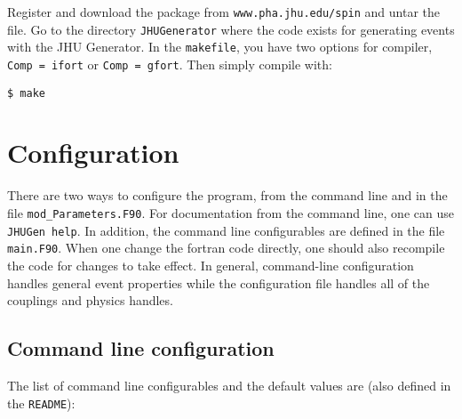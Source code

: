 \documentclass[aps,superscriptaddress,nofootinbib]{revtex4}
\begin{document}
\noindent
Register and download the package from \verb|www.pha.jhu.edu/spin| and untar the file.  Go to the directory \verb|JHUGenerator| where the code exists for generating events with the JHU Generator. In the \verb|makefile|, you have two options for compiler, \verb|Comp = ifort| or \verb|Comp = gfort|.  Then simply compile with:
\begin{verbatim}
$ make
\end{verbatim}

\section{ Configuration }

There are two ways to configure the program, from the command line and in the file \verb|mod_Parameters.F90|.  For documentation from the command line, one can use \verb|JHUGen help|.  In addition, the command line configurables are defined in the file \verb|main.F90|.  When one change the fortran code directly, one should also recompile the code for changes to take effect.  In general, command-line configuration handles general event properties while the configuration file handles all of the couplings and physics handles.

\subsection{ Command line configuration }

The list of command line configurables and the default values are (also defined in the \verb|README|):
\end{document}
